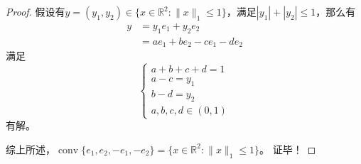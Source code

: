 \begin{problemset}
\begin{proof}
        假设有$y = (y_1,y_2)\in \{x\in \mathbb{R}^2: \|x\|_1\leq 1\}$，满足$|y_1|+|y_2|\leq 1$，那么有
        \[
            \begin{array}{ll}
                y &= y_1e_1 + y_2e_2\\
                &=ae_1+be_2-ce_1-de_2
            \end{array}
        \]
        满足
        \[
            \left\{
                \begin{array}{l}
                    a+b+c+d = 1\\
                    a-c = y_1\\
                    b-d = y_2\\
                    a,b,c,d\in(0,1)
                \end{array}
            \right.
        \]
        有解。

        综上所述，$\operatorname{conv}\{e_1,e_2,-e_1,-e_2\} = \{x\in \mathbb{R}^2: \|x\|_1\leq 1\}$。
        证毕！
    \end{proof}
\end{problemset}